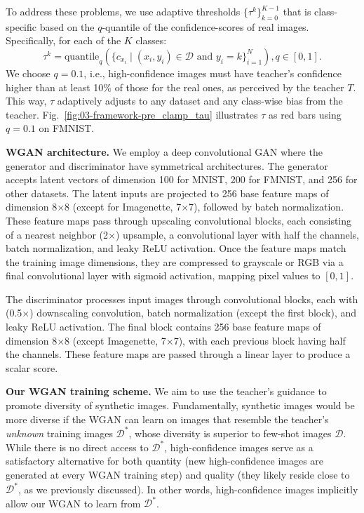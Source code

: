 \documentclass[12pt, a4paper, twoside]{book}
\numberwithin{equation}{chapter}
\theoremstyle{plain}
\theoremstyle{definition}
\theoremstyle{remark}
\newenvironment{foldable}{}{}
\newcommand*{\ie}{i.e.}
\begin{document}
\begin{foldable}
  To address these problems, we use adaptive thresholds $\{\tau^{k}\}_{k=0}^{K-1}$ that is class-specific based on the $q$-quantile of the confidence-scores of real images.
  Specifically, for each of the $K$ classes:
  \begin{equation}
    \tau^{k} = \text{quantile}_{q}(\{c_{x_{i}} \mid(x_{i}, y_{i}) \in \mathcal{D} \text{ and } y_{i} = k\}_{i=1}^{N}), q\in[0,1].
    \label{eq:adaptive-threshold}
  \end{equation}
  We choose $q = 0.1$, \ie, high-confidence images must have teacher's confidence higher than at least 10\% of those for the real ones, as perceived by the teacher $T$.
  This way, $\tau$ adaptively adjusts to any dataset and any class-wise bias from the teacher.
  Fig.~\ref{fig:03-framework-pre_clamp_tau} illustrates $\tau$ as red bars using $q = 0.1$ on FMNIST.
\end{foldable}

\begin{foldable}
  \textbf{WGAN architecture.} We employ a deep convolutional GAN where the generator and discriminator have symmetrical architectures.
  The generator accepts latent vectors of dimension 100 for MNIST, 200 for FMNIST, and 256 for other datasets.
  The latent inputs are projected to 256 base feature maps of dimension 8$\times$8 (except for Imagenette, 7$\times$7), followed by batch normalization.
  These feature maps pass through upscaling convolutional blocks, each consisting of a nearest neighbor (2$\times$) upsample, a convolutional layer with half the channels, batch normalization, and leaky ReLU activation.
  Once the feature maps match the training image dimensions, they are compressed to grayscale or RGB via a final convolutional layer with sigmoid activation, mapping pixel values to $[0, 1]$.

  The discriminator processes input images through convolutional blocks, each with (0.5$\times$) downscaling convolution, batch normalization (except the first block), and leaky ReLU activation.
  The final block contains 256 base feature maps of dimension 8$\times$8 (except Imagenette, 7$\times$7), with each previous block having half the channels.
  These feature maps are passed through a linear layer to produce a scalar score.
\end{foldable}

\begin{foldable}
  \textbf{Our WGAN training scheme.}
  We aim to use the teacher's guidance to promote diversity of synthetic images.
  Fundamentally, synthetic images would be more diverse if the WGAN can learn on images that resemble the teacher's \textit{unknown} training images $\mathcal{D}^{*}$, whose diversity is superior to few-shot images $\mathcal{D}$.
  While there is no direct access to $\mathcal{D}^{*}$, high-confidence images serve as a satisfactory alternative for both quantity (new high-confidence images are generated at every WGAN training step) and quality (they likely reside close to $\mathcal{D}^{*}$, as we previously discussed).
  In other words, high-confidence images implicitly allow our WGAN to learn from $\mathcal{D}^{*}$.
\end{foldable}
\end{document}
